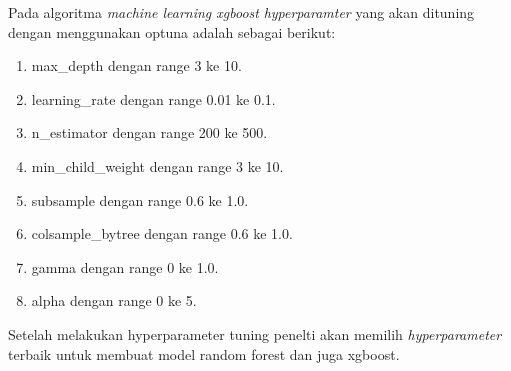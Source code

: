Pada algoritma \textit{machine learning xgboost} \textit{hyperparamter} yang akan dituning dengan menggunakan optuna adalah sebagai berikut\cite{Verma2024ExploringKX}:
\begin{enumerate}[noitemsep]
    \item max\_depth dengan range 3 ke 10.
    \item learning\_rate dengan range 0.01 ke 0.1.
    \item n\_estimator dengan range 200 ke 500.
    \item min\_child\_weight dengan range 3 ke 10.
    \item subsample dengan range 0.6 ke 1.0.
    \item colsample\_bytree dengan range 0.6 ke 1.0.
    \item gamma dengan range 0 ke 1.0.
    \item alpha dengan range 0 ke 5.
\end{enumerate}

Setelah melakukan hyperparameter tuning penelti akan memilih \textit{hyperparameter} terbaik untuk membuat model random forest dan juga xgboost.


